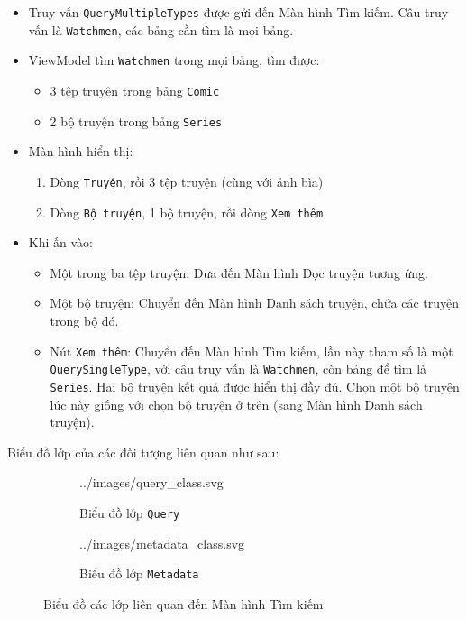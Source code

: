 \documentclass[../../../../thesis]{subfiles}
\begin{document}
\begin{itemize}
    \item
        Truy vấn \texttt{QueryMultipleTypes} được gửi đến Màn hình Tìm kiếm. Câu
        truy vấn là \texttt{Watchmen}, các bảng cần tìm là mọi bảng.
    \item
        ViewModel tìm \texttt{Watchmen} trong mọi bảng, tìm được:

        \begin{itemize}
            \item
              3 tệp truyện trong bảng \texttt{Comic}
            \item
                2 bộ truyện trong bảng \texttt{Series}
        \end{itemize}
    \item
        Màn hình hiển thị:

        \begin{enumerate}
            \item
                Dòng \texttt{Truyện}, rồi 3 tệp truyện (cùng với ảnh bìa)
            \item
                Dòng \texttt{Bộ\ truyện}, 1 bộ truyện, rồi dòng \texttt{Xem\
                thêm}
        \end{enumerate}
    \item
        Khi ấn vào:

        \begin{itemize}
            \item
                Một trong ba tệp truyện: Đưa đến Màn hình Đọc truyện tương ứng.
            \item
                Một bộ truyện: Chuyển đến Màn hình Danh sách truyện, chứa các
                truyện trong bộ đó.
            \item
                Nút \texttt{Xem\ thêm}: Chuyển đến Màn hình Tìm kiếm, lần này
                tham số là một \texttt{QuerySingleType}, với câu truy vấn là
                \texttt{Watchmen}, còn bảng để tìm là \texttt{Series}. Hai bộ
                truyện kết quả được hiển thị đầy đủ. Chọn một bộ truyện lúc này
                giống với chọn bộ truyện ở trên (sang Màn hình Danh sách
                truyện).
        \end{itemize}
\end{itemize}

Biểu đồ lớp của các đối tượng liên quan như sau:

\begin{figure}[H]
    \centering
    \begin{subfigure}[b]{0.36\textwidth}
        \centering
        
            {../images/query_class.svg}
        \caption{Biểu đồ lớp \texttt{Query}}
    \end{subfigure}
    \begin{subfigure}[b]{0.63\textwidth}
        \centering
        
            {../images/metadata_class.svg}
        \caption{Biểu đồ lớp \texttt{Metadata}}
    \end{subfigure}
    \caption{Biểu đồ các lớp liên quan đến Màn hình Tìm kiếm}
    \label{fig:graph-related-class}
\end{figure}
\end{document}
